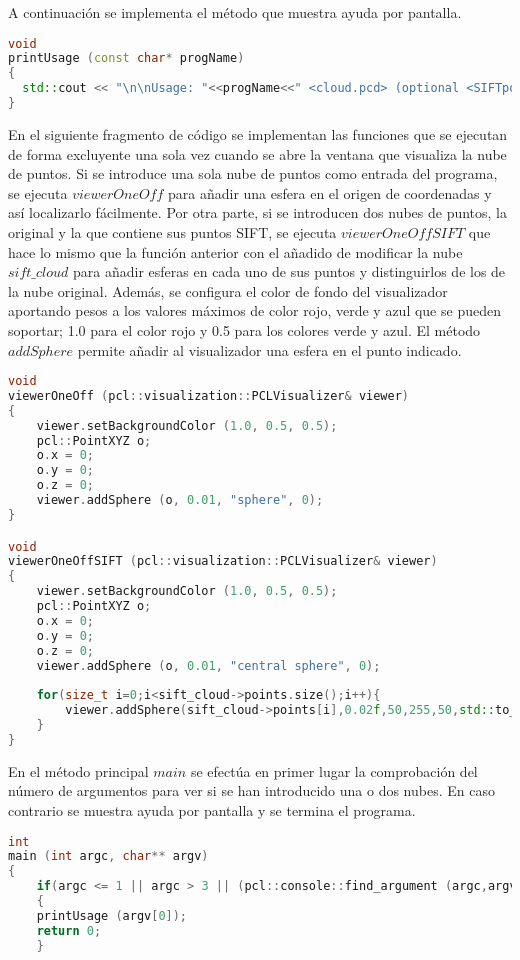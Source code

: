 A continuación se implementa el método que muestra ayuda por pantalla.

\begin{lstlisting}[language=C++,breaklines]
void 
printUsage (const char* progName)
{
  std::cout << "\n\nUsage: "<<progName<<" <cloud.pcd> (optional <SIFTpoints.pcd>)\n\n";
}
\end{lstlisting}

En el siguiente fragmento de código se implementan las funciones que se ejecutan de forma excluyente una sola vez cuando se abre la ventana que visualiza la nube de puntos. 
Si se introduce una sola nube de puntos como entrada del programa, se ejecuta $viewerOneOff$ para añadir una esfera en el origen de coordenadas y así localizarlo fácilmente.
Por otra parte, si se introducen dos nubes de puntos, la original y la que contiene sus puntos SIFT, se ejecuta $viewerOneOffSIFT$ que hace lo mismo que la función anterior con el añadido de modificar la nube $sift\_cloud$ para añadir esferas en cada uno de sus puntos y distinguirlos de los de la nube original.
Además, se configura el color de fondo del visualizador aportando pesos a los valores máximos de color rojo, verde y azul que se pueden soportar; 1.0 para el color rojo y 0.5 para los colores verde y azul. 
El método $addSphere$ permite añadir al visualizador una esfera en el punto indicado.

\begin{lstlisting}[language=C++,breaklines]
void 
viewerOneOff (pcl::visualization::PCLVisualizer& viewer)
{
    viewer.setBackgroundColor (1.0, 0.5, 0.5);
    pcl::PointXYZ o;
    o.x = 0;
    o.y = 0;
    o.z = 0;
    viewer.addSphere (o, 0.01, "sphere", 0); 
}

void 
viewerOneOffSIFT (pcl::visualization::PCLVisualizer& viewer)
{
    viewer.setBackgroundColor (1.0, 0.5, 0.5);
    pcl::PointXYZ o;
    o.x = 0;
    o.y = 0;
    o.z = 0;
    viewer.addSphere (o, 0.01, "central sphere", 0);
    
    for(size_t i=0;i<sift_cloud->points.size();i++){
    	viewer.addSphere(sift_cloud->points[i],0.02f,50,255,50,std::to_string(i));	
    }
}
\end{lstlisting}

En el método principal $main$ se efectúa en primer lugar la comprobación del número de argumentos para ver si se han introducido una o dos nubes. En caso contrario se muestra ayuda por pantalla y se termina el programa.

\begin{lstlisting}[language=C++,breaklines]
int 
main (int argc, char** argv)
{   
    if(argc <= 1 || argc > 3 || (pcl::console::find_argument (argc,argv,"-h")) >= 0 )
    {
	printUsage (argv[0]);
	return 0;
    } 
\end{lstlisting}

